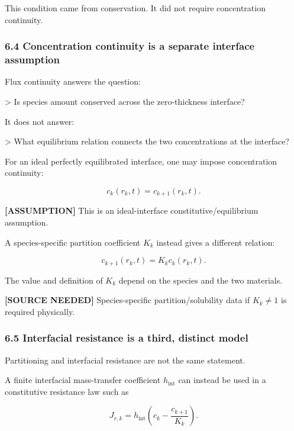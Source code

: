 \documentclass[11pt,a4paper]{article}
\begin{document}
This condition came from conservation. It did not require concentration continuity.

\subsubsection*{6.4 Concentration continuity is a separate interface assumption}

Flux continuity answers the question:

> Is species amount conserved across the zero-thickness interface?

It does not answer:

> What equilibrium relation connects the two concentrations at the interface?

For an ideal perfectly equilibrated interface, one may impose concentration continuity:

\begin{equation}
\boxed{
c_k(r_k,t)=c_{k+1}(r_k,t).
}
\tag{TRISO-INT-115}
\label{eq:triso-int-115}
\end{equation}

\textbf{[ASSUMPTION]} This is an ideal-interface constitutive/equilibrium assumption.

A species-specific partition coefficient $K_k$ instead gives a different relation:

\begin{equation}
\boxed{
c_{k+1}(r_k,t)=K_kc_k(r_k,t).
}
\tag{TRISO-INT-116}
\label{eq:triso-int-116}
\end{equation}

The value and definition of $K_k$ depend on the species and the two materials.

\textbf{[SOURCE NEEDED]} Species-specific partition/solubility data if $K_k\ne1$ is required physically.

\subsubsection*{6.5 Interfacial resistance is a third, distinct model}

Partitioning and interfacial resistance are not the same statement.

A finite interfacial mass-transfer coefficient $h_{\mathrm{int}}$ can instead be used in a constitutive resistance law such as

\begin{equation}
J_{r,k}
=
h_{\mathrm{int}}
\left(
c_k-\frac{c_{k+1}}{K_k}
\right).
\tag{TRISO-INT-117}
\label{eq:triso-int-117}
\end{equation}
\end{document}
